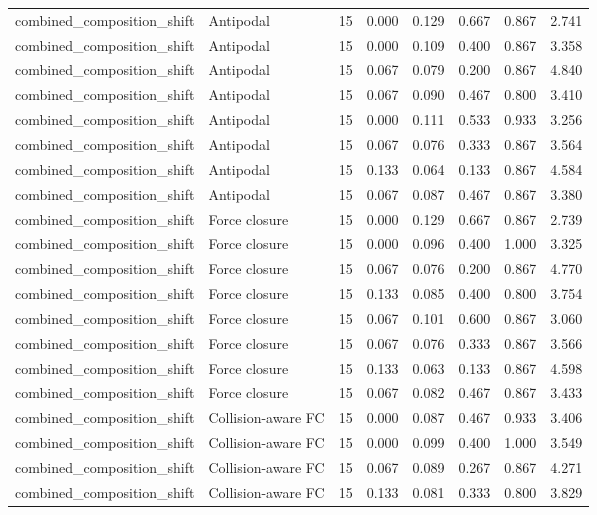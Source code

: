{\begin{longtable}{llrrrrrr}
combined\_composition\_shift & Antipodal & 15 & 0.000 & 0.129 & 0.667 & 0.867 & 2.741 \\
combined\_composition\_shift & Antipodal & 15 & 0.000 & 0.109 & 0.400 & 0.867 & 3.358 \\
combined\_composition\_shift & Antipodal & 15 & 0.067 & 0.079 & 0.200 & 0.867 & 4.840 \\
combined\_composition\_shift & Antipodal & 15 & 0.067 & 0.090 & 0.467 & 0.800 & 3.410 \\
combined\_composition\_shift & Antipodal & 15 & 0.000 & 0.111 & 0.533 & 0.933 & 3.256 \\
combined\_composition\_shift & Antipodal & 15 & 0.067 & 0.076 & 0.333 & 0.867 & 3.564 \\
combined\_composition\_shift & Antipodal & 15 & 0.133 & 0.064 & 0.133 & 0.867 & 4.584 \\
combined\_composition\_shift & Antipodal & 15 & 0.067 & 0.087 & 0.467 & 0.867 & 3.380 \\
combined\_composition\_shift & Force closure & 15 & 0.000 & 0.129 & 0.667 & 0.867 & 2.739 \\
combined\_composition\_shift & Force closure & 15 & 0.000 & 0.096 & 0.400 & 1.000 & 3.325 \\
combined\_composition\_shift & Force closure & 15 & 0.067 & 0.076 & 0.200 & 0.867 & 4.770 \\
combined\_composition\_shift & Force closure & 15 & 0.133 & 0.085 & 0.400 & 0.800 & 3.754 \\
combined\_composition\_shift & Force closure & 15 & 0.067 & 0.101 & 0.600 & 0.867 & 3.060 \\
combined\_composition\_shift & Force closure & 15 & 0.067 & 0.076 & 0.333 & 0.867 & 3.566 \\
combined\_composition\_shift & Force closure & 15 & 0.133 & 0.063 & 0.133 & 0.867 & 4.598 \\
combined\_composition\_shift & Force closure & 15 & 0.067 & 0.082 & 0.467 & 0.867 & 3.433 \\
combined\_composition\_shift & Collision-aware FC & 15 & 0.000 & 0.087 & 0.467 & 0.933 & 3.406 \\
combined\_composition\_shift & Collision-aware FC & 15 & 0.000 & 0.099 & 0.400 & 1.000 & 3.549 \\
combined\_composition\_shift & Collision-aware FC & 15 & 0.067 & 0.089 & 0.267 & 0.867 & 4.271 \\
combined\_composition\_shift & Collision-aware FC & 15 & 0.133 & 0.081 & 0.333 & 0.800 & 3.829 \\

\end{longtable}}

